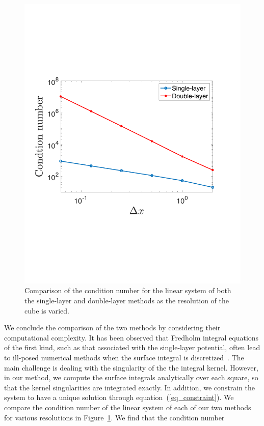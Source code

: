 \begin{figure}[ht]
	\begin{center}
		\hspace{0.1cm}
		\includegraphics[scale = 0.37]{./figures/fig_con_new}
	\end{center}
	\caption{Comparison of the condition number for the linear system of both the single-layer and double-layer methods as the resolution of the cube is varied. }
	\label{fig_condition_number}
\end{figure}
\par
We conclude the comparison of the two methods by considering their computational complexity.
It has been observed that Fredholm integral equations of the first kind, such as that associated with the single-layer potential, often lead to ill-posed numerical
methods when the surface integral is discretized~\cite{delves_numerical_1974, karrila_integral_1989}.
The main challenge is dealing with the singularity of the 
the integral kernel. However, in our method, we compute the surface integrals analytically over each square, so that the kernel singularities are integrated exactly. In addition, we constrain the system to have a unique solution through equation~(\ref{eq_constraint}). We compare the condition number of the linear system of each of our two methods for various resolutions in Figure~\ref{fig_condition_number}. We find that the condition number
